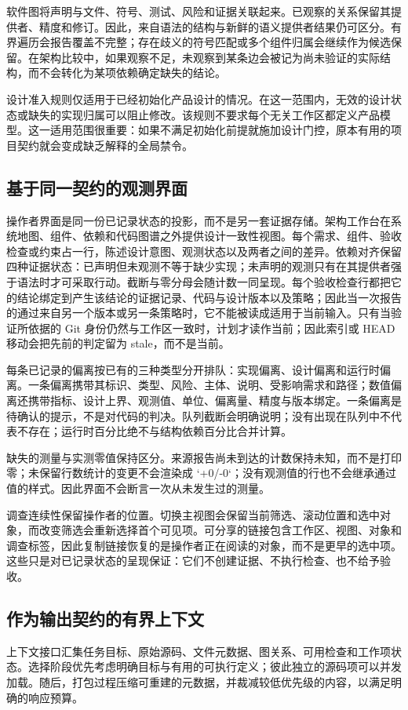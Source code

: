 软件图将声明与文件、符号、测试、风险和证据关联起来。已观察的关系保留其提供者、精度和修订。因此，来自语法的结构与新鲜的语义提供者结果仍可区分。有界遍历会报告覆盖不完整；存在歧义的符号匹配或多个组件归属会继续作为候选保留。在架构比较中，如果观察不足，未观察到某条边会被记为尚未验证的实际结构，而不会转化为某项依赖确定缺失的结论。

设计准入规则仅适用于已经初始化产品设计的情况。在这一范围内，无效的设计状态或缺失的实现归属可以阻止修改。该规则不要求每个无关工作区都定义产品模型。这一适用范围很重要：如果不满足初始化前提就施加设计门控，原本有用的项目契约就会变成缺乏解释的全局禁令。

\subsection{基于同一契约的观测界面}
操作者界面是同一份已记录状态的投影，而不是另一套证据存储。架构工作台在系统地图、组件、依赖和代码图谱之外提供设计一致性视图。每个需求、组件、验收检查或约束占一行，陈述设计意图、观测状态以及两者之间的差异。依赖对齐保留四种证据状态：已声明但未观测不等于缺少实现；未声明的观测只有在其提供者强于语法时才可采取行动。截断与零分母会随计数一同呈现。每个验收检查行都把它的结论绑定到产生该结论的证据记录、代码与设计版本以及策略；因此当一次报告的通过来自另一个版本或另一条策略时，它不能被读成适用于当前输入。只有当验证所依据的 Git 身份仍然与工作区一致时，计划才读作当前；因此索引或 HEAD 移动会把先前的判定留为 stale，而不是当前。

每条已记录的偏离按已有的三种类型分开排队：实现偏离、设计偏离和运行时偏离。一条偏离携带其标识、类型、风险、主体、说明、受影响需求和路径；数值偏离还携带指标、设计上界、观测值、单位、偏离量、精度与版本绑定。一条偏离是待确认的提示，不是对代码的判决。队列截断会明确说明；没有出现在队列中不代表不存在；运行时百分比绝不与结构依赖百分比合并计算。

缺失的测量与实测零值保持区分。来源报告尚未到达的计数保持未知，而不是打印零；未保留行数统计的变更不会渲染成 `+0/-0`；没有观测值的行也不会继承通过值的样式。因此界面不会断言一次从未发生过的测量。

调查连续性保留操作者的位置。切换主视图会保留当前筛选、滚动位置和选中对象，而改变筛选会重新选择首个可见项。可分享的链接包含工作区、视图、对象和调查标签，因此复制链接恢复的是操作者正在阅读的对象，而不是更早的选中项。这些只是对已记录状态的呈现保证：它们不创建证据、不执行检查、也不给予验收。

\subsection{作为输出契约的有界上下文}
上下文接口汇集任务目标、原始源码、文件元数据、图关系、可用检查和工作项状态。选择阶段优先考虑明确目标与有用的可执行定义；彼此独立的源码项可以并发加载。随后，打包过程压缩可重建的元数据，并裁减较低优先级的内容，以满足明确的响应预算。

